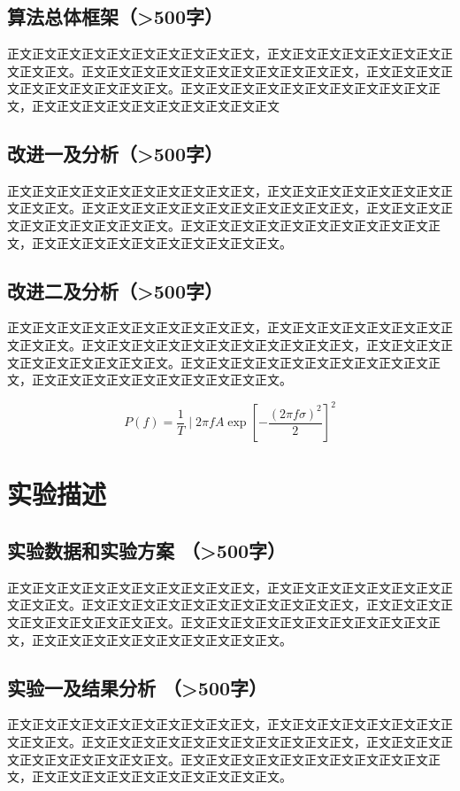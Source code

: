 \documentclass{article}
\begin{document}
\subsection{算法总体框架（>500字）}
正文正文正文正文正文正文正文正文正文正文，正文正文正文正文正文正文正文正文正文正文。正文正文正文正文正文正文正文正文正文正文正文，正文正文正文正文正文正文正文正文正文正文。正文正文正文正文正文正文正文正文正文正文正文，正文正文正文正文正文正文正文正文正文正文


\subsection{改进一及分析（>500字）}
正文正文正文正文正文正文正文正文正文正文，正文正文正文正文正文正文正文正文正文正文。正文正文正文正文正文正文正文正文正文正文正文，正文正文正文正文正文正文正文正文正文正文。正文正文正文正文正文正文正文正文正文正文正文，正文正文正文正文正文正文正文正文正文正文。

\subsection{改进二及分析（>500字）}
正文正文正文正文正文正文正文正文正文正文，正文正文正文正文正文正文正文正文正文正文。正文正文正文正文正文正文正文正文正文正文正文，正文正文正文正文正文正文正文正文正文正文。正文正文正文正文正文正文正文正文正文正文正文，正文正文正文正文正文正文正文正文正文正文。



\begin{equation}\label{eq:sample}
  P(f)=\frac{1}{T} \mid 2 \pi f A \exp \left[-\frac{(2 \pi f \sigma)^{2}}{2}\right]^{2}
  \end{equation}
\section{实验描述}
\subsection{实验数据和实验方案 （>500字）}
正文正文正文正文正文正文正文正文正文正文，正文正文正文正文正文正文正文正文正文正文。正文正文正文正文正文正文正文正文正文正文正文，正文正文正文正文正文正文正文正文正文正文。正文正文正文正文正文正文正文正文正文正文正文，正文正文正文正文正文正文正文正文正文正文。

\subsection{实验一及结果分析 （>500字）}
正文正文正文正文正文正文正文正文正文正文，正文正文正文正文正文正文正文正文正文正文。正文正文正文正文正文正文正文正文正文正文正文，正文正文正文正文正文正文正文正文正文正文。正文正文正文正文正文正文正文正文正文正文正文，正文正文正文正文正文正文正文正文正文正文。
\end{document}
